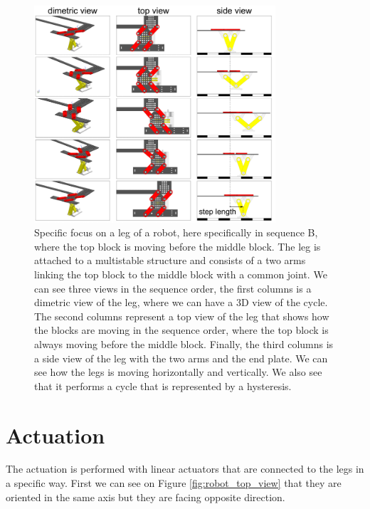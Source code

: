         \begin{figure}
            \centering
            \includegraphics[width=0.8\textwidth]{images/forward_step.png}
            \caption{Specific focus on a leg of a robot, here specifically in sequence B, where the top block is moving before the middle block. The leg is attached to a multistable structure and consists of a two arms linking the top block to the middle block with a common joint. We can see three views in the sequence order, the first columns is a dimetric view of the leg, where we can have a 3D view of the cycle. The second columns represent a top view of the leg that shows how the blocks are moving in the sequence order, where the top block is always moving before the middle block. Finally, the third columns is a side view of the leg with the two arms and the end plate. We can see how the legs is moving horizontally and vertically. We also see that it performs a cycle that is represented by a hysteresis.}
            \label{fig:forward_step}
        \end{figure}
        
    \section{Actuation}\label{sec:actuation}
        The actuation is performed with linear actuators that are connected to the legs in a specific way. First we can see on Figure \ref{fig:robot_top_view} that they are oriented in the same axis but they are facing opposite direction. 